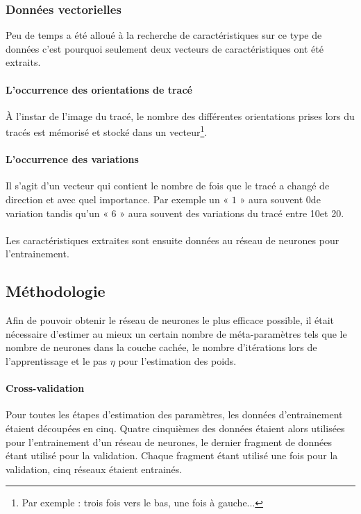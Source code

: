 \subsubsection{Données vectorielles} Peu de temps a été alloué à la recherche de caractéristiques sur ce type de données c'est pourquoi seulement deux vecteurs de caractéristiques ont été extraits.

\paragraph{L'occurrence des orientations de tracé} À l'instar de l'image du tracé,  le nombre des différentes orientations prises lors du tracés est mémorisé et stocké dans un vecteur\footnote{Par exemple : trois fois vers le bas, une fois à gauche...}.
\paragraph{L'occurrence des variations} Il s'agit d'un vecteur qui contient le nombre de fois que le tracé a changé de direction et avec quel importance. Par exemple un « $1$ » aura souvent 0\degre de variation tandis qu'un « $6$ » aura souvent des variations du tracé entre 10\degre et 20\degre.


\paragraph{} Les caractéristiques extraites sont ensuite données au réseau de neurones pour l'entrainement.
\subsection{Méthodologie}
Afin de pouvoir obtenir le réseau de neurones le plus efficace possible, il était nécessaire d'estimer au mieux un certain nombre de méta-paramètres tels que le nombre de neurones dans la couche cachée, le nombre d'itérations lors de l'apprentissage et le pas $\eta$ pour l'estimation des poids.

\paragraph{Cross-validation} Pour toutes les étapes d'estimation des paramètres, les données d'entrainement étaient découpées en cinq. Quatre cinquièmes des données étaient alors utilisées pour l'entrainement d'un réseau de neurones, le dernier fragment de données étant utilisé pour la validation. Chaque fragment étant utilisé une fois pour la validation, cinq réseaux étaient entrainés.

